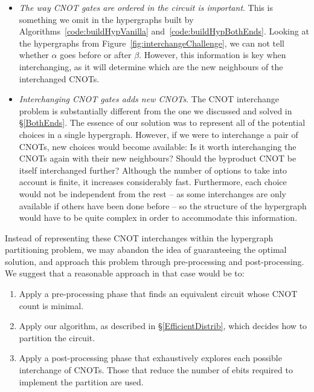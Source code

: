\begin{itemize}
  \item \textit{The way CNOT gates are ordered in the circuit is important}. This is something we omit in the hypergraphs built by Algorithms~\ref{code:buildHypVanilla} and~\ref{code:buildHypBothEnds}. Looking at the hypergraphs from Figure~\ref{fig:interchangeChallenge}, we can not tell whether \(\alpha\) goes before or after \(\beta\). However, this information is key when interchanging, as it will determine which are the new neighbours of the interchanged CNOTs. %

  \item \textit{Interchanging CNOT gates adds new CNOTs}. The CNOT interchange problem is substantially different from the one we discussed and solved in \S\ref{BothEnds}. The essence of our solution was to represent all of the potential choices in a single hypergraph. However, if we were to interchange a pair of CNOTs, new choices would become available: Is it worth interchanging the CNOTs again with their new neighbours? Should the byproduct CNOT be itself interchanged further? Although the number of options to take into account is finite, it increases considerably fast. Furthermore, each choice would not be independent from the rest -- as some interchanges are only available if others have been done before -- so the structure of the hypergraph would have to be quite complex in order to accommodate this information.
\end{itemize}

Instead of representing these CNOT interchanges within the hypergraph partitioning problem, we may abandon the idea of guaranteeing the optimal solution, and approach this problem through pre-processing and post-processing. We suggest that a reasonable approach in that case would be to:
\begin{enumerate} 
\item Apply a pre-processing phase that finds an equivalent circuit whose CNOT count is minimal.
\item Apply our algorithm, as described in \S\ref{EfficientDistrib}, which decides how to partition the circuit. 
\item Apply a post-processing phase that exhaustively explores each possible interchange of CNOTs. Those that reduce the number of ebits required to implement the partition are used.
\end{enumerate}

